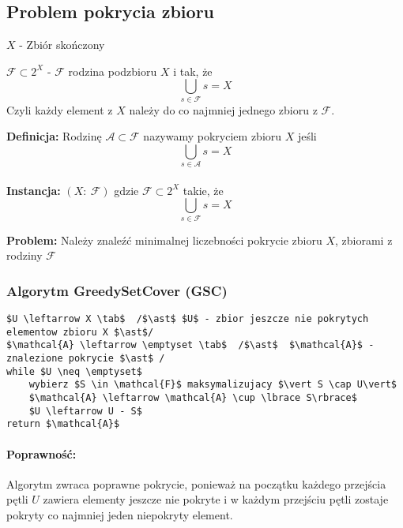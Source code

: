 \subsection{Problem pokrycia zbioru}
$X$ - Zbiór skończony

$\mathcal{F} \subset 2^{X}$ - $\mathcal{F}$ rodzina podzbioru $X$ i tak, że $$\bigcup_{s\in \mathcal{F}}s = X$$ 
Czyli każdy element z $X$ należy do co najmniej jednego zbioru z $\mathcal{F}$.

\textbf{Definicja: }Rodzinę $\mathcal{A}\subset \mathcal{F}$ nazywamy pokryciem zbioru $X$ jeśli $$\bigcup_{s\in \mathcal{A}}s = X$$
\\
\textbf{Instancja: }$(X:\ \mathcal{F})$ gdzie $\mathcal{F} \subset 2^{X}$ takie, że $$\bigcup_{s\in \mathcal{F}}s = X$$

\textbf{Problem: }Należy znaleźć minimalnej liczebności pokrycie zbioru $X$, zbiorami z rodziny $\mathcal{F}$

\subsubsection{Algorytm GreedySetCover (GSC)}
\begin{lstlisting}[caption={GreedySetCover(G)}]
$U \leftarrow X \tab$  /$\ast$ $U$ - zbior jeszcze nie pokrytych elementow zbioru X $\ast$/
$\mathcal{A} \leftarrow \emptyset \tab$  /$\ast$  $\mathcal{A}$ - znalezione pokrycie $\ast$ /
while $U \neq \emptyset$
	wybierz $S \in \mathcal{F}$ maksymalizujacy $\vert S \cap U\vert$
	$\mathcal{A} \leftarrow \mathcal{A} \cup \lbrace S\rbrace$
	$U \leftarrow U - S$
return $\mathcal{A}$
\end{lstlisting}

\paragraph{Poprawność: }
Algorytm zwraca poprawne pokrycie, ponieważ na początku każdego przejścia pętli $U$ zawiera elementy jeszcze nie pokryte i w każdym przejściu pętli zostaje pokryty co najmniej jeden niepokryty element.

